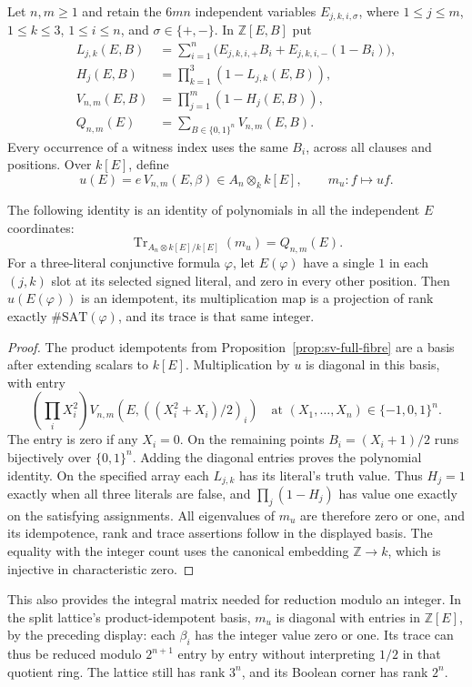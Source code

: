 Let $n,m\ge1$ and retain the $6mn$ independent variables
$E_{j,k,i,\sigma}$, where $1\le j\le m$, $1\le k\le3$,
$1\le i\le n$, and $\sigma\in\{+,-\}$. In
$\mathbb Z[E,B]$ put
\begin{align*}
 L_{j,k}(E,B)&=\sum_{i=1}^n
   \bigl(E_{j,k,i,+}B_i+E_{j,k,i,-}(1-B_i)\bigr),\\
 H_j(E,B)&=\prod_{k=1}^3(1-L_{j,k}(E,B)),\\
 V_{n,m}(E,B)&=\prod_{j=1}^m(1-H_j(E,B)),\\
 Q_{n,m}(E)&=\sum_{B\in\{0,1\}^n}V_{n,m}(E,B).
\end{align*}
Every occurrence of a witness index uses the same $B_i$, across all
clauses and positions. Over $k[E]$, define
\[
 u(E)=e\,V_{n,m}(E,\beta)\in A_n\otimes_k k[E],
 \qquad m_u:f\longmapsto uf.
\]

\begin{theorem}\label{thm:sv-trace}
The following identity is an identity of polynomials in all the
independent $E$ coordinates:
\[
 \operatorname{Tr}_{A_n\otimes k[E]/k[E]}(m_u)=Q_{n,m}(E).
\]
For a three-literal conjunctive formula $\varphi$, let $E(\varphi)$
have a single $1$ in each $(j,k)$ slot at its selected signed literal,
and zero in every other position. Then $u(E(\varphi))$ is an
idempotent, its multiplication map is a projection of rank exactly
$\#\mathrm{SAT}(\varphi)$, and its trace is that same integer.
\end{theorem}
\begin{proof}
The product idempotents from Proposition~\ref{prop:sv-full-fibre}
are a basis after extending scalars to $k[E]$. Multiplication by $u$
is diagonal in this basis, with entry
\[
 \left(\prod_i X_i^2\right)
 V_{n,m}\left(E,\left((X_i^2+X_i)/2\right)_i\right)
 \quad\text{at }(X_1,\ldots,X_n)\in\{-1,0,1\}^n.
\]
The entry is zero if any $X_i=0$. On the remaining points
$B_i=(X_i+1)/2$ runs bijectively over $\{0,1\}^n$.
Adding the diagonal entries proves the polynomial identity.
On the specified array each $L_{j,k}$ has its literal's truth value.
Thus $H_j=1$ exactly when all three literals are false, and
$\prod_j(1-H_j)$ has value one exactly on the satisfying assignments.
All eigenvalues of $m_u$ are therefore zero or one, and its
idempotence, rank and trace assertions follow in the displayed basis.
The equality with the integer count uses the canonical embedding
$\mathbb Z\to k$, which is injective in characteristic zero.
\end{proof}

This also provides the integral matrix needed for reduction modulo
an integer. In the split lattice's product-idempotent basis, $m_u$
is diagonal with entries in $\mathbb Z[E]$, by the preceding
display: each $\beta_i$ has the integer value zero or one.
Its trace can thus be reduced modulo $2^{n+1}$ entry by entry
without interpreting $1/2$ in that quotient ring. The lattice still
has rank $3^n$, and its Boolean corner has rank $2^n$.

